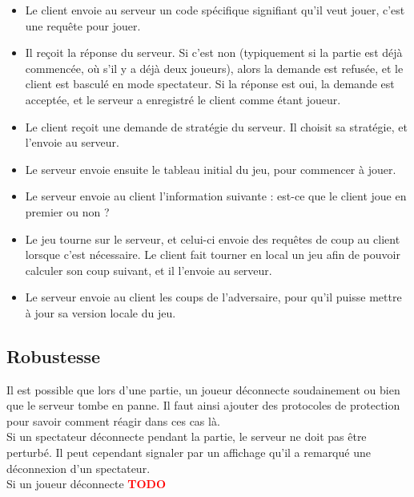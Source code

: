 \documentclass[a4paper]{article}
\newcommand{\TODO}{\textcolor{red}{\textbf{TODO}}}
\begin{document}
%
\begin{itemize}
	\setlength\itemsep{1em}
	\item Le client envoie au serveur un code spécifique signifiant qu'il veut jouer, c'est une requête pour jouer.
	\item Il reçoit la réponse du serveur. Si c'est non (typiquement si la partie est déjà commencée, où s'il y a déjà deux joueurs), alors la demande est refusée, et le client est basculé en mode spectateur. Si la réponse est oui, la demande est acceptée, et le serveur a enregistré le client comme étant joueur.
	\item Le client reçoit une demande de stratégie du serveur. Il choisit sa stratégie, et l'envoie au serveur.
	\item Le serveur envoie ensuite le tableau initial du jeu, pour commencer à jouer.
	\item Le serveur envoie au client l'information suivante : est-ce que le client joue en premier ou non ?
	\item Le jeu tourne sur le serveur, et celui-ci envoie des requêtes de coup au client lorsque c'est nécessaire. Le client fait tourner en local un jeu afin de pouvoir calculer son coup suivant, et il l'envoie au serveur.
	\item Le serveur envoie au client les coups de l'adversaire, pour qu'il puisse mettre à jour sa version locale du jeu.
\end{itemize}
%


\subsection{Robustesse}

Il est possible que lors d'une partie, un joueur déconnecte soudainement ou bien que le serveur tombe en panne. Il faut ainsi ajouter des protocoles de protection pour savoir comment réagir dans ces cas là. \\

Si un spectateur déconnecte pendant la partie, le serveur ne doit pas être perturbé. Il peut cependant signaler par un affichage qu'il a remarqué une déconnexion d'un spectateur. \\

Si un joueur déconnecte \TODO \\
\end{document}
